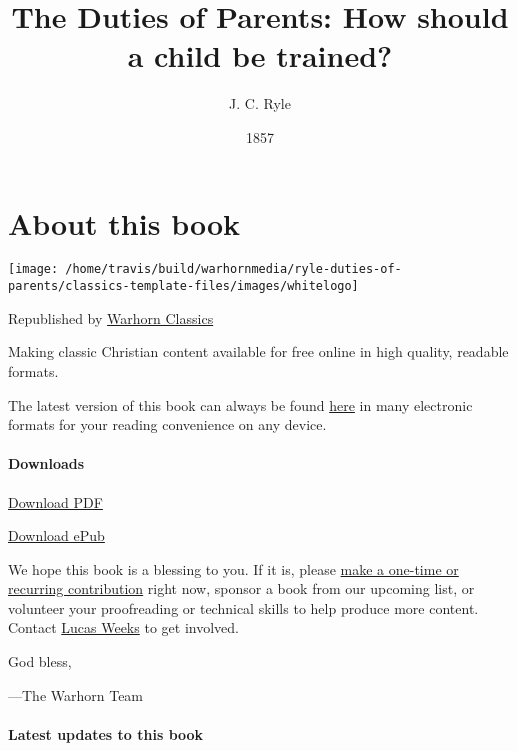 \documentclass[
]{book}
\title{The Duties of Parents: How should a child be trained?}
\author{J. C. Ryle}
\date{1857}
\begin{document}
\maketitle



{
\setcounter{tocdepth}{1}
\tableofcontents
}
\hypertarget{about-this-book}{%
\chapter*{About this book}\label{about-this-book}}

\begin{center}\texttt{[image: /home/travis/build/warhornmedia/ryle-duties-of-parents/classics-template-files/images/whitelogo]} \end{center}

Republished by \href{https://classics.warhornmedia.com/}{Warhorn Classics}

Making classic Christian content available for free online in high quality, readable formats.

The latest version of this book can always be found \href{https://warhornmedia.github.io/ryle-duties-of-parents}{here} in many electronic formats for your reading convenience on any device.

\hypertarget{downloads}{%
\subsubsection*{Downloads}\label{downloads}}

\href{https://warhornmedia.github.io/ryle-duties-of-parents/Ryle-Duties_of_Parents.pdf}{Download PDF}

\href{https://warhornmedia.github.io/ryle-duties-of-parents/Ryle-Duties_of_Parents.epub}{Download ePub}

We hope this book is a blessing to you. If it is, please \href{https://warhornmedia.com/give}{make a one-time or recurring contribution} right now, sponsor a book from our upcoming list, or volunteer your proofreading or technical skills to help produce more content. Contact \href{mailto:lucas@beggarsborn.com}{Lucas Weeks} to get involved.

God bless,

---The Warhorn Team

\hypertarget{latest-updates-to-this-book}{%
\subsubsection*{Latest updates to this book}\label{latest-updates-to-this-book}}
\end{document}
